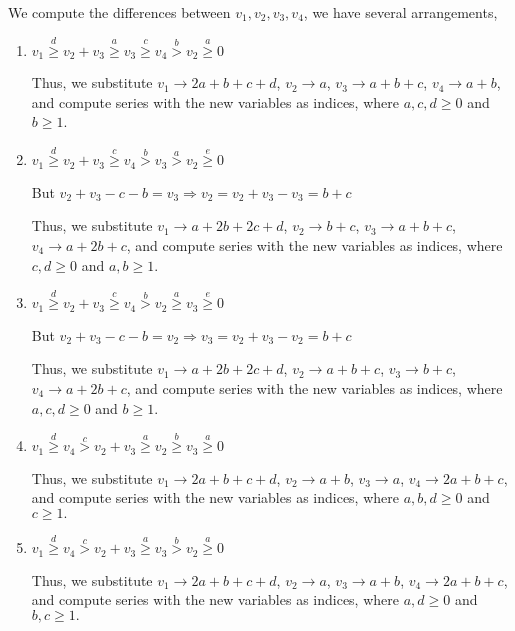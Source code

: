 \documentclass{article}
\begin{document}
We compute the differences between $v_1,v_2,v_3,v_4$, we have several arrangements,
\begin{enumerate}
    \item 
$v_1\overset{d}{\geq}{v_2+v_3}\overset{a}{\geq}v_3\overset{c}{\geq}{v_4}\overset{b}>v_2\overset{a}{\geq}{0}$

Thus, we substitute $v_1\rightarrow{2a+b+c+d}$, $v_2\rightarrow{a}$, $v_3\rightarrow{a+b+c}$, $v_4\rightarrow{a+b}$, and compute series with the new variables as indices, where $a,c,d\geq{0}$ and $b\geq{1}$.
\item 
$v_1\overset{d}{\geq}{v_2+v_3}\overset{c}{\geq}v_4\overset{b}{>}{v_3}\overset{a}{>}v_2\overset{e}{\geq}{0}$

But $v_2+v_3-c-b=v_3\Rightarrow{v_2=v_2+v_3-v_3=b+c}$

Thus, we substitute $v_1\rightarrow{a+2b+2c+d}$, $v_2\rightarrow{b+c}$, $v_3\rightarrow{a+b+c}$, $v_4\rightarrow{a+2b+c}$, and compute series with the new variables as indices, where $c,d\geq{0}$ and $a,b\geq{1}$.

\item 
$v_1\overset{d}{\geq}{v_2+v_3}\overset{c}{\geq}v_4\overset{b}{>}{v_2}\overset{a}{\geq}v_3\overset{e}{\geq}{0}$

But $v_2+v_3-c-b=v_2\Rightarrow{v_3=v_2+v_3-v_2=b+c}$

Thus, we substitute $v_1\rightarrow{a+2b+2c+d}$, $v_2\rightarrow{a+b+c}$, $v_3\rightarrow{b+c}$, $v_4\rightarrow{a+2b+c}$, and compute series with the new variables as indices, where $a,c,d\geq{0}$ and $b\geq{1}$.

\item 
$v_1\overset{d}{\geq}{v_4}\overset{c}{>}v_2+v_3\overset{a}{\geq}{v_2}\overset{b}{\geq}v_3\overset{a}{\geq}{0}$

Thus, we substitute $v_1\rightarrow{2a+b+c+d}$, $v_2\rightarrow{a+b}$, $v_3\rightarrow{a}$, $v_4\rightarrow{2a+b+c}$, and compute series with the new variables as indices, where $a,b,d\geq{0}$ and $c\geq{1}.$

\item 
$v_1\overset{d}{\geq}{v_4}\overset{c}{>}v_2+v_3\overset{a}{\geq}{v_3}\overset{b}{>}v_2\overset{a}{\geq}{0}$

Thus, we substitute $v_1\rightarrow{2a+b+c+d}$, $v_2\rightarrow{a}$, $v_3\rightarrow{a+b}$, $v_4\rightarrow{2a+b+c}$, and compute series with the new variables as indices, where $a,d\geq{0}$ and $b,c\geq{1}.$
\end{enumerate}
\end{document}

